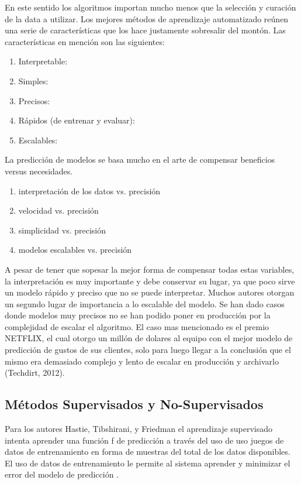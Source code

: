 En este sentido los algoritmos importan mucho menos que la selección y curación de la data a utilizar. Los mejores métodos de aprendizaje automatizado reúnen una serie de características que los hace justamente sobresalir del montón. Las características en mención son las siguientes:

\begin{enumerate}
	\item Interpretable: 
	\item Simples:
	\item Precisos:
	\item Rápidos (de entrenar y evaluar):
	\item Escalables: 
\end{enumerate}

La predicción de modelos se basa mucho en el arte de compensar beneficios versus necesidades.

\begin{enumerate}
	\item interpretación de los datos vs. precisión
	\item velocidad vs. precisión
	\item simplicidad vs. precisión
	\item modelos escalables vs. precisión 
\end{enumerate}

A pesar de tener que sopesar la mejor forma de compensar todas estas variables, la interpretación es muy importante y debe conservar su lugar, ya que poco sirve un modelo rápido y preciso que no se puede interpretar. Muchos autores otorgan un segundo lugar de importancia a lo escalable del modelo. Se han dado casos donde modelos muy precisos no se han podido poner en producción por la complejidad de escalar el algoritmo. El caso mas mencionado es el premio NETFLIX, el cual otorgo un millón de dolares al equipo con el mejor modelo de predicción de gustos de sus clientes, solo para luego llegar a la conclusión que el mismo era demasiado complejo y lento de escalar en producción y archivarlo (Techdirt, 2012).

\subsection{Métodos Supervisados y No-Supervisados}
Para los autores Hastie, Tibshirani, y Friedman el aprendizaje supervisado intenta aprender una función f de predicción a través del uso de uso juegos de datos de entrenamiento en forma de muestras del total de los datos disponibles. El uso de datos de entrenamiento le permite al sistema aprender y minimizar el error del modelo de predicción \cite{theElements}.  


